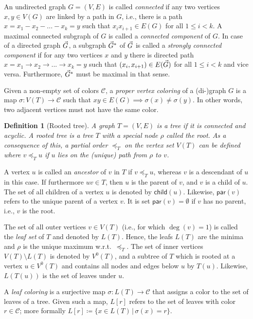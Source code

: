 \documentclass[hidelinks,11pt]{scrreprt}
\newtheorem{definition}[theorem]{Definition}
\def\arrowedvec{\mathaccent"017E}
\newcommand{\G}{\arrowedvec{G}}
\newcommand{\child}{\mathsf{child}}
\newcommand{\parent}{\mathsf{par}}
\begin{document}
An undirected graph $G=(V,E)$ is called \textit{connected} if any two vertices $x,y \in V(G)$ are linked by a path in $G$, i.e., there is a path $x=x_1-x_2-...-x_k=y$ such that $x_ix_{i+1} \in E(G)$ for all $1 \le i < k$.
A maximal connected subgraph of $G$ is called a \textit{connected component} of $G$. In case of a directed graph $\G$, a subgraph $\G^*$ of $\G$ is called a \textit{strongly connected component} if for any two vertices $x$ and $y$ there is directed path $x=x_1 \rightarrow x_2\rightarrow ...\rightarrow x_k=y$ such that $(x_i,x_{i+1}) \in E(\G)$ for all $1 \le i < k$ and vice versa. Furthermore, $\G^*$ must be maximal in that sense.

Given a non-empty set of colors $\mathcal{C}$, a \emph{proper vertex coloring} of a (di-)graph $G$ is a map $\sigma \colon V(T) \to \mathcal{C}$ such that $xy \in E(G) \implies \sigma(x) \ne \sigma(y)$. In other words, two adjacent vertices must not have the same color.

\begin{definition}[Rooted tree]
	A graph $T=(V,E)$ is a \emph{tree} if it is connected and acyclic. A \emph{rooted tree} is a tree $T$ with a special node $\rho$ called the \emph{root}. As a consequence of this, a partial order $\preceq_T$ on the vertex set $V(T)$ can be defined where $v \preceq_T u$ if $u$ lies on the (unique) path from $\rho$ to $v$.
\end{definition}

A vertex $u$ is called an \textit{ancestor} of $v$ in $T$ if $v \preceq_T u$, whereas $v$ is a descendant of $u$ in this case. If furthermore $uv \in T$, then $u$ is the parent of $v$, and $v$ is a child of $u$. The set of all children of a vertex $u$ is denoted by $\child(u)$. Likewise, $\parent(v)$ refers to the unique parent of a vertex $v$. It is set $\parent(v)=\emptyset$ if $v$ has no parent, i.e., $v$ is the root.

The set of all outer vertices $v \in V(T)$ (i.e., for which $\deg(v)=1$) is called the \textit{leaf set} of $T$ and denoted by $L(T)$. Hence, the leafs $L(T)$ are the minima and $\rho$ is the unique maximum w.r.t.\ $\preceq_T$.
The set of inner vertices $V(T)\setminus L(T)$ is denoted by $V^0(T)$, and a subtree of $T$ which is rooted at a vertex $u \in V^0(T)$ and contains all nodes and edges below $u$ by $T(u)$. Likewise, $L(T(u))$ is the set of leaves under $u$.

A \emph{leaf coloring} is a surjective map $\sigma\colon L(T) \to \mathcal{C}$ that assigns a color to the set of leaves of a tree.
Given such a map, $L[r]$ refers to the set of leaves with color $r\in\mathcal{C}$; more formally $L[r]\coloneqq \{x\in L(T)\,|\,\sigma(x)=r\}$.
\end{document}
